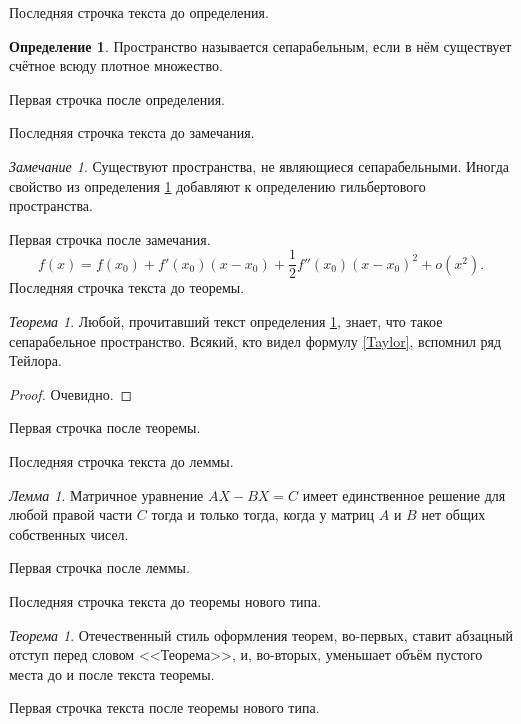 \documentclass[a4paper,12pt]{article}
\theoremstyle{definition}
\newtheorem{defin}{Определение}
\theoremstyle{remark}
\newtheorem{rmk}{Замечание}
\theoremstyle{theorem}
\newtheorem{thm}{Теорема}
\newtheorem{lem}{Лемма}
\theoremstyle{SovietTheorem}
\newtheorem{sthm}{Теорема}
\begin{document}
%
%
\noindent Последняя строчка текста до определения.
\begin{defin}\label{separDefin}
Пространство называется сепарабельным, если в нём существует счётное всюду плотное множество.
\end{defin}
Первая строчка после определения.

\noindent Последняя строчка текста до замечания.
\begin{rmk}
Существуют пространства, не являющиеся сепарабельными. Иногда свойство из определения \ref{separDefin} добавляют к определению гильбертового пространства.
\end{rmk}
Первая строчка после замечания.
\begin{equation}\label{Taylor}
f(x) = f(x_0) + f'(x_0)(x-x_0) + \dfrac{1}{2}f''(x_0)(x-x_0)^2 + o(x^2).
\end{equation}
\noindent Последняя строчка текста до теоремы.
\begin{thm}
Любой, прочитавший текст определения \ref{separDefin}, знает, что такое сепарабельное пространство. Всякий, кто видел формулу \eqref{Taylor}, вспомнил ряд Тейлора.
\end{thm}
\begin{proof}
 Очевидно.
\end{proof}
Первая строчка после теоремы.

\noindent Последняя строчка текста до леммы.
\begin{lem}
Матричное уравнение $AX - BX = C$ имеет единственное решение для любой правой части $C$ тогда и только тогда, когда у матриц $A$ и $B$ нет общих собственных чисел.
\end{lem}
Первая строчка после леммы.

\noindent Последняя строчка текста до теоремы нового типа.
\begin{sthm}
Отечественный стиль оформления теорем, во-первых, ставит абзацный отступ перед словом <<Теорема>>, и, во-вторых, уменьшает объём пустого места до и после текста теоремы.
\end{sthm}
Первая строчка текста после теоремы нового типа.
\end{document}
